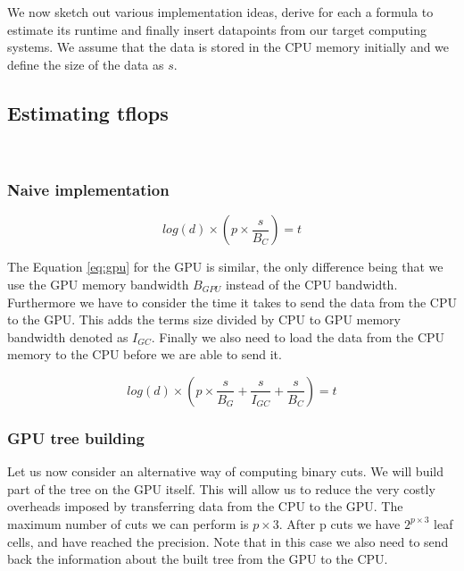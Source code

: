 \documentclass[]{article}
\begin{document}
We now sketch out various implementation ideas, derive for each a formula to estimate its runtime and finally insert datapoints from our target computing systems.
We assume that the data is stored in the CPU memory initially and we define the size of the data as $s$. 

\subsection{Estimating tflops}


\

\subsubsection{Naive implementation}

\begin{center}
	\begin{equation}
			log(d) \times \left ( p \times \frac{ s }{B_{C}} \right ) = t
	\end{equation}
\end{center}

\vspace{5mm}


The Equation \ref{eq:gpu} for the GPU is similar, the only difference being that we use the GPU memory bandwidth $B_{GPU}$ instead of the CPU bandwidth. Furthermore we have to consider the time it takes to send the data from the CPU to the GPU. This adds the terms size divided by CPU to GPU memory bandwidth denoted as $I_{GC}$. Finally we also need to load the data from the CPU memory to the CPU before we are able to send it. 

\begin{center}
	\begin{equation}
			log(d) \times \left ( p \times \frac{s}{B_{G}} + \frac{s}{I_{GC}}  + \frac{s}{B_{C}} \right ) = t
		\label{eq:gpu}
	\end{equation}
\end{center}

\vspace{5mm}


\subsubsection{GPU tree building}

Let us now consider an alternative way of computing binary cuts. We will build part of the tree on the GPU itself. This will allow us to reduce the very costly overheads imposed by transferring data from the CPU to the GPU. The maximum number of cuts we can perform is $p \times 3$. After p cuts we have $2^{p \times 3}$ leaf cells, and have reached the precision. Note that in this case we also need to send back the information about the built tree from the GPU to the CPU. 
\end{document}
